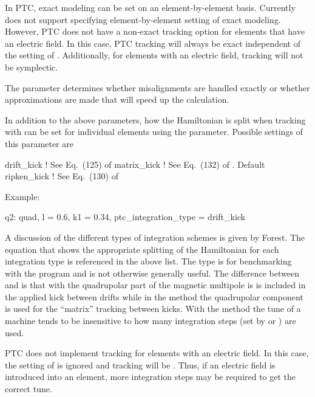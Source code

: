 In PTC, exact modeling can be set on an element-by-element basis. Currently \bmad does
not support specifying element-by-element setting of exact modeling. However, PTC does
not have a non-exact tracking option for elements that have an electric field. In this
case, PTC tracking will always be exact independent of the setting of .
Additionally, for elements with an electric field, tracking will not be symplectic.

The  parameter determines whether
misalignments are handled exactly or whether approximations are made
that will speed up the calculation.

In addition to the above parameters, how the Hamiltonian is split when
tracking with  can be set for individual elements using the
 parameter. Possible settings of this
parameter are
\begin{example}
  drift_kick    ! See Eq.~(125) of \cite{b:geo.int}
  matrix_kick   ! See Eq.~(132) of \cite{b:geo.int}. Default
  ripken_kick   ! See Eq.~(130) of \cite{b:geo.int}
\end{example}
Example:
\begin{example}
  q2: quad, l = 0.6, k1 = 0.34, ptc_integration_type = drift_kick
\end{example}
A discussion of the different types of integration schemes is given by
Forest\cite{b:geo.int}. The equation that shows the appropriate splitting of the
Hamiltonian for each integration type is referenced in the above list. The
 type is for benchmarking with the  program and is not
otherwise generally useful. The difference between  and  is
that with  the quadrupolar part of the magnetic multipole is is included in
the applied kick between drifts while in the  method the quadrupolar
component is used for the ``matrix'' tracking between kicks. With the
 method the tune of a machine tends to be insensitive to how many
integration steps (set by  or ) are used. 

PTC does not implement  tracking for elements with an electric field.  In
this case, the setting of  is ignored and tracking will be
. Thus, if an electric field is introduced into an element, more
integration steps may be required to get the correct tune.


